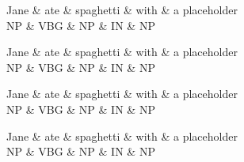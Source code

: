 \documentclass{article}
\begin{document}
    \begin{dependency}%
        \begin{deptext}
			Jane \& ate \& spaghetti \& with \& a placeholder \\
            NP \& VBG \& NP \& IN \& NP \\
        \end{deptext}
    \end{dependency}
    
    \begin{dependency}
        \begin{deptext}
			Jane \& ate \& spaghetti \& with \& a placeholder \\
            NP \& VBG \& NP \& IN \& NP \\
        \end{deptext}
    \end{dependency}
    
    \begin{dependency}
        \begin{deptext}
			Jane \& ate \& spaghetti \& with \& a placeholder \\
            NP \& VBG \& NP \& IN \& NP \\
        \end{deptext}
    \end{dependency}
    
    \begin{dependency}
        \begin{deptext}
			Jane \& ate \& spaghetti \& with \& a placeholder \\
            NP \& VBG \& NP \& IN \& NP \\
        \end{deptext}
    \end{dependency}
\end{document}

